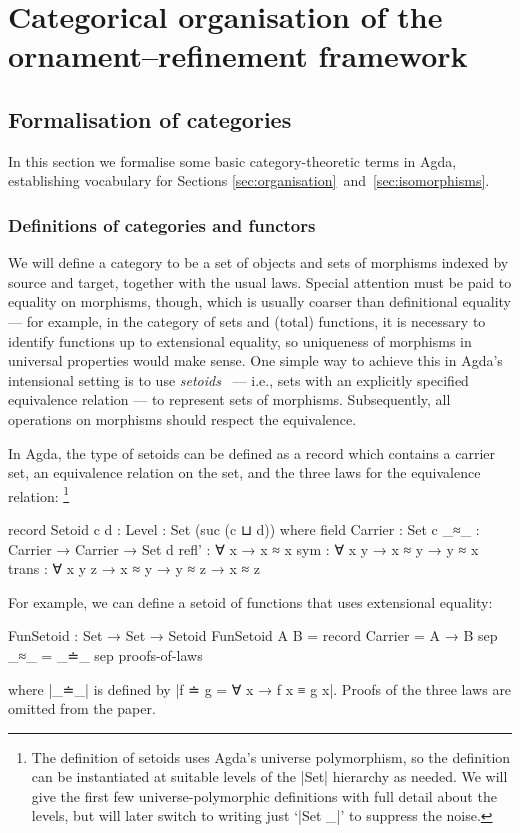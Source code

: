 \chapter{Categorical organisation of the ornament--refinement framework}
\label{chap:categorical}

\section{Formalisation of categories}
\label{sec:categories}

In this section we formalise some basic category-theoretic terms in Agda, establishing vocabulary for Sections \ref{sec:organisation}~and~\ref{sec:isomorphisms}.

\subsection{Definitions of categories and functors}

We will define a category to be a set of objects and sets of morphisms indexed by source and target, together with the usual laws.
Special attention must be paid to equality on morphisms, though, which is usually coarser than definitional equality --- for example, in the category of sets and (total) functions, it is necessary to identify functions up to extensional equality, so uniqueness of morphisms in universal properties would make sense.
One simple way to achieve this in Agda's intensional setting is to use \emph{setoids}~\cite{Barthe-setoids} --- i.e., sets with an explicitly specified equivalence relation --- to represent sets of morphisms.
Subsequently, all operations on morphisms should respect the equivalence.

In Agda, the type of setoids can be defined as a record which contains a carrier set, an equivalence relation on the set, and the three laws for the equivalence relation:%
\footnote{The definition of setoids uses Agda's universe polymorphism, so the definition can be instantiated at suitable levels of the |Set| hierarchy as needed.
We will give the first few universe-polymorphic definitions with full detail about the levels, but will later switch to writing just `|Set _|' to suppress the noise.}
\begin{code}
record Setoid {c d : Level} : Set (suc (c ⊔ d)) where
  field
    Carrier  :  Set c
    _≈_      :  Carrier → Carrier → Set d
    refl'    :  ∀ {x} → x ≈ x
    sym      :  ∀ {x y} → x ≈ y → y ≈ x
    trans    :  ∀ {x y z} → x ≈ y → y ≈ z → x ≈ z
\end{code}
For example, we can define a setoid of functions that uses extensional equality:
\begin{code}
FunSetoid : Set → Set → Setoid
FunSetoid A B = record  {    Carrier  =  A → B
                        sep  _≈_      =  _≐_
                        sep  proofs-of-laws  }
\end{code}
where |_≐_| is defined by |f ≐ g = ∀ x → f x ≡ g x|.
Proofs of the three laws are omitted from the paper.

